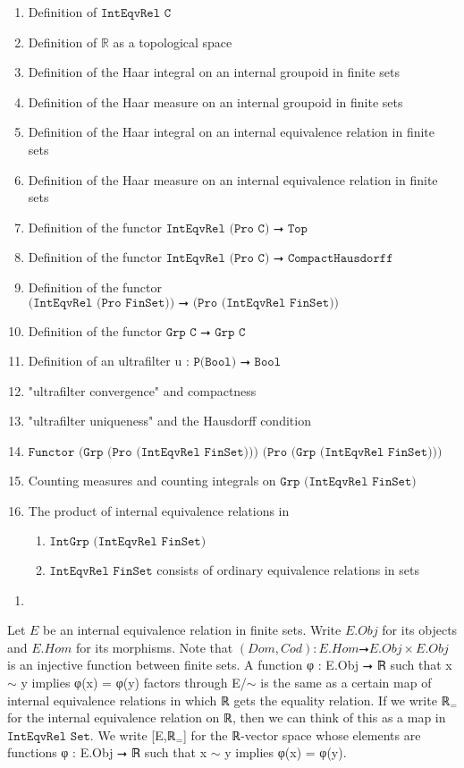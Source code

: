 \documentclass[13pt]{amsart}
\begin{document}
\begin{enumerate}
\item Definition of $\texttt{IntEqvRel C}$
\item Definition of $\texttt{ℝ}$ as a topological space
\item Definition of the Haar integral on an internal groupoid in finite sets
\item Definition of the Haar measure on an internal groupoid in finite sets
\item Definition of the Haar integral on an internal equivalence relation in finite sets
\item Definition of the Haar measure on an internal equivalence relation in finite sets
\item Definition of the functor $\texttt{IntEqvRel (Pro C) ⭢ Top}$
\item Definition of the functor $\texttt{IntEqvRel (Pro C) ⭢ CompactHausdorff}$
\item Definition of the functor $\texttt{(IntEqvRel (Pro FinSet)) ⭢ (Pro (IntEqvRel FinSet))}$
\item Definition of the functor $\texttt{Grp C ⭢ Grp C}$
\item Definition of an ultrafilter u : $\texttt{P(Bool) ⭢ Bool}$
\item "ultrafilter convergence" and compactness
\item "ultrafilter uniqueness" and the Hausdorff condition
\item $\texttt{Functor (Grp (Pro (IntEqvRel FinSet))) (Pro (Grp (IntEqvRel FinSet)))}$
\item Counting measures and counting integrals on $\texttt{Grp (IntEqvRel FinSet)}$
\item The product of internal equivalence relations in 
\begin{enumerate}
\item $\texttt{IntGrp (IntEqvRel FinSet)}$
\item $\texttt{IntEqvRel FinSet}$ consists of ordinary equivalence relations in sets
\end{enumerate}
\end{enumerate}

\begin{enumerate}
\item 
\end{enumerate}

Let $E$ be an internal equivalence relation in finite sets. Write $E.Obj$ for its objects and $E.Hom$ for its morphisms. Note that $(Dom,Cod): E.Hom ⭢ E.Obj \times E.Obj$ is an injective function between finite sets. A function φ : E.Obj ⭢ ℝ such that x $\sim$ y implies φ(x) = φ(y) factors through E/$\sim$ is the same as a certain map of internal equivalence relations in which ℝ gets the equality relation. If we write ℝ${}_{=}$ for the internal equivalence relation on ℝ, then we can think of this as a map in $\texttt{IntEqvRel Set}$. We write [E,ℝ${}_{=}$] for the ℝ-vector space whose elements are functions φ : E.Obj ⭢ ℝ such that x $\sim$ y implies φ(x) = φ(y).
\fi
\end{document}
